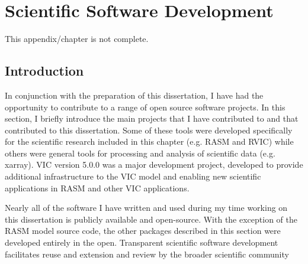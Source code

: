 \appendix
\raggedbottom\sloppy

\chapter{Scientific Software Development}
\label{chap:software}

This appendix/chapter is not complete. %

\section{Introduction}
In conjunction with the preparation of this dissertation, I have had the opportunity to contribute to a range of open source software projects.
In this section, I briefly introduce the main projects that I have contributed to and that contributed to this dissertation.
Some of these tools were developed specifically for the scientific research included in this chapter (e.g. RASM and RVIC) while others were general tools for processing and analysis of scientific data (e.g. xarray).
VIC version 5.0.0 was a major development project, developed to provide additional infrastructure to the VIC model and enabling new scientific applications in RASM and other VIC applications.

Nearly all of the software I have written and used during my time working on this dissertation is publicly available and open-source.
With the exception of the RASM model source code, the other packages described in this section were developed entirely in the open.
Transparent scientific software development facilitates reuse and extension and review by the broader scientific community

